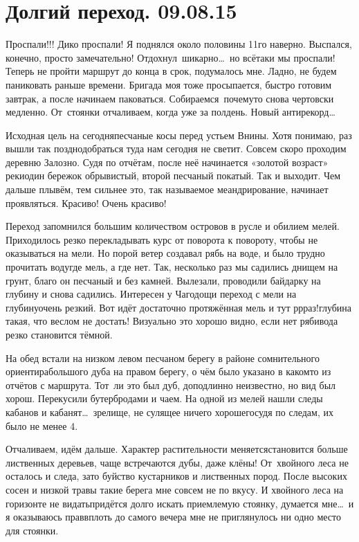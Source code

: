 \chapter{Долгий переход. 09.08.15}

Проспали!!! Дико проспали! Я поднялся около половины 11\sdash го наверно. Выспался, конечно, просто замечательно! Отдохнул~шикарно\ldots~но всё\sdash таки мы проспали! Теперь не пройти маршрут до конца в срок, подумалось мне. Ладно, не будем паниковать раньше времени. Бригада моя тоже просыпается, быстро готовим завтрак, а после начинаем паковаться. Собираемся~почему\sdash то снова чертовски медленно. От~стоянки отчаливаем, когда уже за полдень. Новый антирекорд\ldots~

Исходная цель на сегодня\mdash песчаные косы перед устьем Внины. Хотя понимаю, раз вышли так поздно\mdash добраться туда нам сегодня не светит. Совсем скоро проходим деревню Залозно. Судя по отчётам, после неё начинается «золотой возраст» реки\mdash один бережок обрывистый, второй песчаный покатый. Так и выходит. Чем дальше плывём, тем сильнее это, так называемое меандрирование, начинает проявляться. Красиво! Очень красиво! 

Переход запомнился большим количеством островов в русле и обилием мелей. Приходилось резко перекладывать курс от поворота к повороту, чтобы не оказываться на мели. Но порой ветер создавал рябь на воде, и было трудно прочитать воду\mdash где мель, а где нет. Так, несколько раз мы садились днищем на грунт, благо он песчаный и без камней. Вылезали, проводили байдарку на глубину и снова садились. Интересен у Чагодощи переход с мели на глубину\mdash очень резкий. Вот идёт достаточно протяжённая мель и тут р\sdash р\sdash раз!\mdash глубина такая, что веслом не достать! Визуально это хорошо видно, если нет ряби\mdash вода резко становится тёмной.

На обед встали на низком левом песчаном берегу в районе сомнительного ориентира\mdash большого дуба на правом берегу, о чём было указано в каком\sdash то из отчётов с маршрута. Тот~ли это был дуб, доподлинно неизвестно, но вид был хорош. Перекусили бутербродами и чаем. На одной из мелей нашли следы кабанов и кабанят\ldots~зрелище, не сулящее ничего хорошего\mdash судя по следам, их было не менее 4. 

Отчаливаем, идём дальше. Характер растительности меняется\mdash становится больше лиственных деревьев, чаще встречаются дубы, даже клёны! От~хвойного леса не осталось и следа, зато буйство кустарников и лиственных пород. После высоких сосен и низкой травы такие берега мне совсем не по вкусу. И хвойного леса на горизонте не видать\mdash придётся долго искать приемлемую стоянку, думается мне\ldots~и я оказываюсь прав\mdash вплоть до самого вечера мне не приглянулось ни одно место для стоянки.

